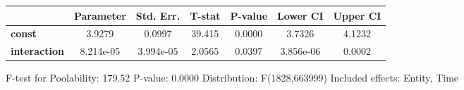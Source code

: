 \begin{center}
\begin{tabular}{lclc}
\end{tabular}
\begin{tabular}{lcccccc}
                     & \textbf{Parameter} & \textbf{Std. Err.} & \textbf{T-stat} & \textbf{P-value} & \textbf{Lower CI} & \textbf{Upper CI}  \\
\midrule
\textbf{const}       &       3.9279       &       0.0997       &      39.415     &      0.0000      &       3.7326      &       4.1232       \\
\textbf{interaction} &     8.214e-05      &     3.994e-05      &      2.0565     &      0.0397      &     3.856e-06     &       0.0002       \\
\bottomrule
\end{tabular}
\end{center}

F-test for Poolability: 179.52 \newline
 P-value: 0.0000 \newline
 Distribution: F(1828,663999) \newline
  \newline
 Included effects: Entity, Time